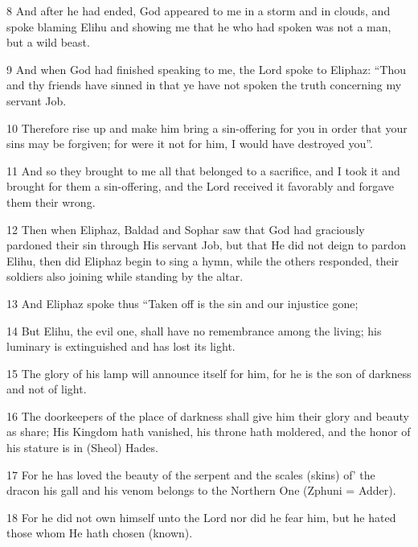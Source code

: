 \par 8 And after he had ended, God appeared to me in a storm and in clouds, and spoke blaming Elihu and showing me that he who had spoken was not a man, but a wild beast.

\par 9 And when God had finished speaking to me, the Lord spoke to Eliphaz: “Thou and thy friends have sinned in that ye have not spoken the truth concerning my servant Job.

\par 10 Therefore rise up and make him bring a sin-offering for you in order that your sins may be forgiven; for were it not for him, I would have destroyed you”.

\par 11 And so they brought to me all that belonged to a sacrifice, and I took it and brought for them a sin-offering, and the Lord received it favorably and forgave them their wrong.

\par 12 Then when Eliphaz, Baldad and Sophar saw that God had graciously pardoned their sin through His servant Job, but that He did not deign to pardon Elihu, then did Eliphaz begin to sing a hymn, while the others responded, their soldiers also joining while standing by the altar.

\par 13 And Eliphaz spoke thus “Taken off is the sin and our injustice gone;

\par 14 But Elihu, the evil one, shall have no remembrance among the living; his luminary is extinguished and has lost its light.

\par 15 The glory of his lamp will announce itself for him, for he is the son of darkness and not of light.

\par 16 The doorkeepers of the place of darkness shall give him their glory and beauty as share; His Kingdom hath vanished, his throne hath moldered, and the honor of his stature is in (Sheol) Hades.

\par 17 For he has loved the beauty of the serpent and the scales (skins) of’ the dracon his gall and his venom belongs to the Northern One (Zphuni = Adder).

\par 18 For he did not own himself unto the Lord nor did he fear him, but he hated those whom He hath chosen (known).


